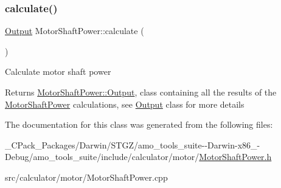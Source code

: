 \subsubsection{\texorpdfstring{calculate()}{calculate()}\hspace{0.1cm}{\footnotesize\ttfamily [3/3]}}
{\footnotesize\ttfamily \hyperlink{struct_motor_shaft_power_1_1_output}{Output} Motor\+Shaft\+Power\+::calculate (\begin{DoxyParamCaption}{ }\end{DoxyParamCaption})}

Calculate motor shaft power \begin{DoxyReturn}{Returns}
\hyperlink{struct_motor_shaft_power_1_1_output}{Motor\+Shaft\+Power\+::\+Output}, class containing all the results of the \hyperlink{class_motor_shaft_power}{Motor\+Shaft\+Power} calculations, see \hyperlink{struct_motor_shaft_power_1_1_output}{Output} class for more details 
\end{DoxyReturn}


The documentation for this class was generated from the following files\+:\begin{DoxyCompactItemize}
\item 
\+\_\+\+C\+Pack\+\_\+\+Packages/\+Darwin/\+S\+T\+G\+Z/amo\+\_\+tools\+\_\+suite-\/-\/\+Darwin-\/x86\+\_-\/\+Debug/amo\+\_\+tools\+\_\+suite/include/calculator/motor/\hyperlink{___c_pack___packages_2_darwin_2_s_t_g_z_2amo__tools__suite--_darwin-x86__64-_debug_2amo__tools__2881b0c637e0a7724aa4b2570e6e46e8}{Motor\+Shaft\+Power.\+h}\item 
src/calculator/motor/Motor\+Shaft\+Power.\+cpp\end{DoxyCompactItemize}
